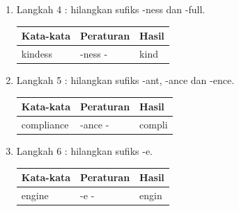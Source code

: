 \begin{enumerate}
    \item Langkah 4 : hilangkan sufiks -ness dan -full.
\begin{table}[!ht]
\centering
\begin{tabular}{|l|l|l|}
\hline
Kata-kata & Peraturan          & Hasil  \\ \hline
kindess  & -ness - & kind \\ \hline
\end{tabular}
\end{table}

    \item Langkah 5 : hilangkan sufiks -ant, -ance dan -ence.
\begin{table}[!ht]
\centering
\begin{tabular}{|l|l|l|}
\hline
Kata-kata & Peraturan          & Hasil  \\ \hline
compliance  & -ance - & compli \\ \hline
\end{tabular}
\end{table}

    \item Langkah 6 : hilangkan sufiks -e.
\begin{table}[!ht]
\centering
\begin{tabular}{|l|l|l|}
\hline
Kata-kata & Peraturan          & Hasil  \\ \hline
engine  & -e - & engin \\ \hline
\end{tabular}
\end{table}

\end{enumerate}


